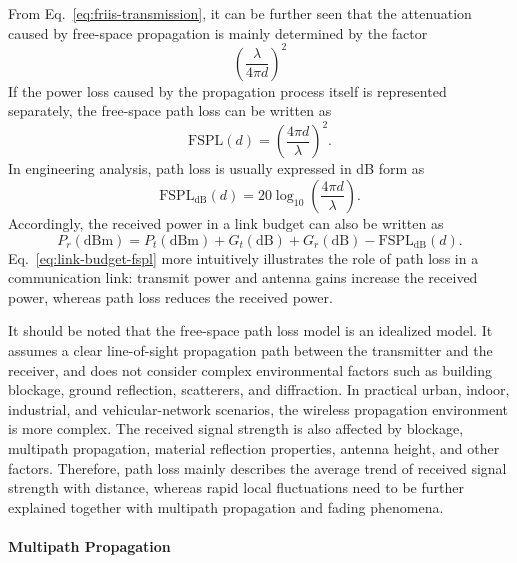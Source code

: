From Eq.~\eqref{eq:friis-transmission},
it can be further seen that the attenuation caused by free-space propagation is mainly determined by the factor
\[
    \left(
        \frac{\lambda}{4\pi d}
    \right)^2
\]
If the power loss caused by the propagation process itself is represented separately,
the free-space path loss can be written as
\begin{equation}
    \mathrm{FSPL}(d)
    =
    \left(
        \frac{4\pi d}{\lambda}
    \right)^2 .
    \label{eq:free-space-path-loss-linear}
\end{equation}
In engineering analysis,
path loss is usually expressed in dB form as
\begin{equation}
    \mathrm{FSPL}_{\mathrm{dB}}(d)
    =
    20\log_{10}
    \left(
        \frac{4\pi d}{\lambda}
    \right).
    \label{eq:free-space-path-loss-db}
\end{equation}
Accordingly,
the received power in a link budget can also be written as
\begin{equation}
    P_r(\mathrm{dBm})
    =
    P_t(\mathrm{dBm})
    +
    G_t(\mathrm{dB})
    +
    G_r(\mathrm{dB})
    -
    \mathrm{FSPL}_{\mathrm{dB}}(d).
    \label{eq:link-budget-fspl}
\end{equation}
Eq.~\eqref{eq:link-budget-fspl} more intuitively illustrates the role of path loss
in a communication link:
transmit power and antenna gains increase the received power,
whereas path loss reduces the received power.

It should be noted that the free-space path loss model is an idealized model.
It assumes a clear line-of-sight propagation path between the transmitter and the receiver,
and does not consider complex environmental factors such as building blockage,
ground reflection,
scatterers,
and diffraction.
In practical urban,
indoor,
industrial,
and vehicular-network scenarios,
the wireless propagation environment is more complex.
The received signal strength is also affected by blockage,
multipath propagation,
material reflection properties,
antenna height,
and other factors.
Therefore,
path loss mainly describes the average trend of received signal strength with distance,
whereas rapid local fluctuations need to be further explained together with multipath propagation
and fading phenomena.

\paragraph{Multipath Propagation}

